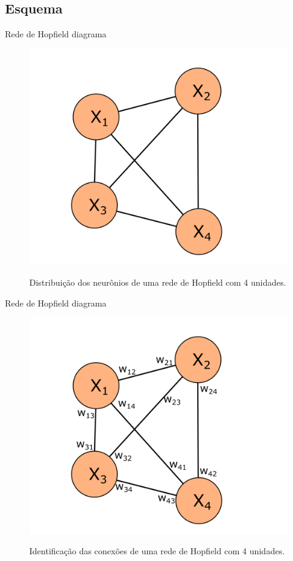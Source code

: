 \subsection{Esquema}
\begin{frame}{Rede de Hopfield diagrama}
  \begin{figure}[h]{}%
    \label{fig:hopfield}%
    \includegraphics[scale=0.5]{images/hopfield.png}
    \caption{Distribuição dos neurônios de uma rede de Hopfield com 4 unidades.}
  \end{figure}
\end{frame}

\begin{frame}{Rede de Hopfield diagrama}
  \begin{figure}[h]{}%
    \label{fig:hopfield-full}%
    \includegraphics[scale=0.5]{images/hopfield_full.png}
    \caption{Identificação das conexões de uma rede de Hopfield com 4 unidades.}
  \end{figure}
\end{frame}

